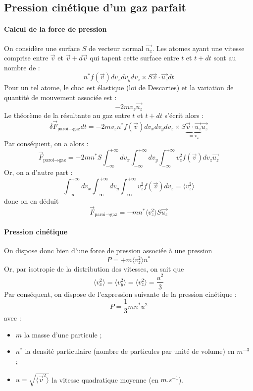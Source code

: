 \documentclass[french]{book}
\theoremstyle{plain}
\theoremstyle{definition}
\theoremstyle{remark}
\newcommand{\st}{^*}
\newcommand{\inv}{^{-1}}
\begin{document}
\subsection{Pression cinétique d'un gaz parfait}

\paragraph{Calcul de la force de pression} On considère une surface $S$ de vecteur normal $\overrightarrow{u_z}$. Les atomes ayant une vitesse comprise entre $\overrightarrow{v}$ et $\overrightarrow{v}+d\overrightarrow{v}$ qui tapent cette surface entre $t$ et $t+dt$ sont au nombre de : $$n\st f(\overrightarrow{v})dv_xdv_ydv_z\times S\overrightarrow{v}\cdot\overrightarrow{u_z} dt$$Pour un tel atome, le choc est élastique (loi de Descartes) et la variation de quantité de mouvement associée est : $$-2mv_z\overrightarrow{u_z}$$ Le théorème de la résultante au gaz entre $t$ et $t+dt$ s'écrit alors : $$\delta\overrightarrow{F}_{\text{paroi}\to\text{gaz}}dt=-2mv_zn\st f(\overrightarrow{v})dv_xdv_ydv_z\times S\underbrace{\overrightarrow{v}\cdot\overrightarrow{u_z}}_{=v_z} \overrightarrow{u_z}$$ Par conséquent, on a alors : $$\overrightarrow{F}_{\text{paroi}\to\text{gaz}}=-2mn\st S\int_{-\infty}^{+\infty}dv_x\int_{-\infty}^{+\infty}dv_y\int_{-\infty}^{+\infty}v_z^2f(\overrightarrow{v})dv_z\overrightarrow{u_z}$$ Or, on a d'autre part : $$\int_{-\infty}^{+\infty}dv_x\int_{-\infty}^{+\infty}dv_y\int_{-\infty}^{+\infty}v_z^2f(\overrightarrow{v})dv_z=\langle v_z^2\rangle$$ donc on en déduit $$\overrightarrow{F}_{\text{paroi}\to\text{gaz}}=-mn\st\langle v_z^2\rangle S\overrightarrow{u_z}$$

\paragraph{Pression cinétique} On dispose donc bien d'une force de pression associée à une pression $$P=+m\langle v_z^2\rangle n\st$$ Or, par isotropie de la distribution des vitesses, on sait que $$\langle v_x^2\rangle=\langle v_y^2\rangle=\langle v_z^2\rangle=\frac{u^2}{3}$$ Par conséquent, on dispose de l'expression suivante de la pression cinétique : $$P=\frac{1}{3}mn\st u^2$$ avec : \begin{itemize}
	\item $m$ la masse d'une particule ;
	\item $n\st$ la densité particulaire (nombre de particules par unité de volume) en $m^{-3}$ ;
	\item $u=\sqrt{\langle \overrightarrow{v}^2\rangle}$ la vitesse quadratique moyenne (en $m.s\inv$).
\end{itemize}
\end{document}
